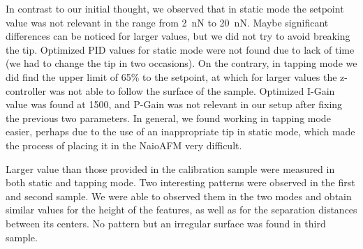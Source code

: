 \documentclass[11pt,a4paper]{article}
\begin{document}
In contrast to our initial thought, we observed that in static mode the setpoint value was not relevant in the range from \SI{2}{\nano\N} to \SI{20}{\nano\N}. Maybe significant differences can be noticed for larger values, but we did not try to avoid breaking the tip. Optimized PID values for static mode were not found due to lack of time (we had to change the tip in two occasions). On the contrary, in tapping mode we did find the upper limit of 65\% to the setpoint, at which for larger values the z-controller was not able to follow the surface of the sample. Optimized I-Gain value was found at 1500, and P-Gain was not relevant in our setup after fixing the previous two parameters. In general, we found working in tapping mode easier, perhaps due to the use of an inappropriate tip in static mode, which made the process of placing it in the NaioAFM very difficult.

Larger value than those provided in the calibration sample were measured in both static and tapping mode. Two interesting patterns were observed in the first and second sample. We were able to observed them in the two modes and obtain similar values for the height of the features, as well as for the separation distances between its centers. No pattern but an irregular surface was found in third sample.

\nocite{*}
\vfill


\end{document}
